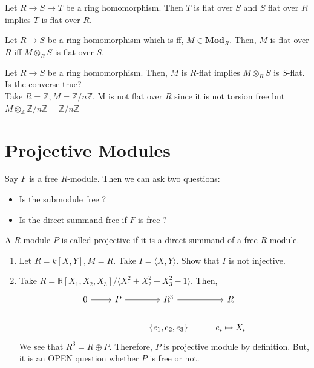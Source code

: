 \documentclass[oneside, 12pt]{scrbook}
\newcommand{\RR}{\mathbb R}
\newcommand{\ZZ}{\mathbb Z}
\theoremstyle{theorem}
\begin{document}
\begin{theorem}
Let $R\rightarrow S \rightarrow T$ be a ring homomorphism. Then $T$ is flat over $S$ and $S$ flat over $R$ implies $T$ is flat over $R$.
\end{theorem}

\begin{exercise}
Let $R\rightarrow S$ be a ring homomorphism which is ff, $M \in \mathbf{Mod}_{R}$. Then, $M$ is flat over $R$ iff $M \otimes_{R} S$ is flat over $S$.
\end{exercise}

\begin{remark}
Let $R \rightarrow S$ be a ring homomorphism. Then, $M$ is $R$-flat implies $M\otimes_{R} S $ is $S$-flat. Is the converse true? \\

Take $R=\ZZ, M = \ZZ / n\ZZ$. M is not flat over $R$ since it is not torsion free but $M \otimes_{\ZZ} \ZZ / n\ZZ = \ZZ / n \ZZ$
\end{remark}

\section{Projective Modules}

Say $F$ is a free $R$-module. Then we can ask two questions: 
\begin{itemize}
\item Is the submodule free ? 
\item Is the direct summand free if $F$ is free ?
\end{itemize}

\begin{definition}
A $R$-module $P$ is called projective if it is a direct summand of a free $R$-module.
\end{definition}

\begin{exercise}
\begin{enumerate}
\item Let $R = k[X,Y], M=R$. Take $I = \langle X,Y \rangle$. Show that $I$ is not injective.  
\item Take $R = \RR[X_{1},X_{2},X_{3}]/ \langle X_{1}^2 + X_{2}^2 + X_{3}^2 -1 \rangle$. Then, 
\[\begin{tikzcd}
	0 & {P } & {R^3} & R \\
	&& {\{e_{1},e_{2},e_{3}\}} & {e_{i} \mapsto X_{i}}
	\arrow[from=1-1, to=1-2]
	\arrow[from=1-2, to=1-3]
	\arrow[from=1-3, to=1-4]
\end{tikzcd}\]
We see that $R^3 = R \oplus P$. Therefore, $P$ is projective module by definition. But, it is an \textcolor{BrickRed}{OPEN} question whether $P$ is free or not.
\end{enumerate}
\end{exercise}
\end{document}
